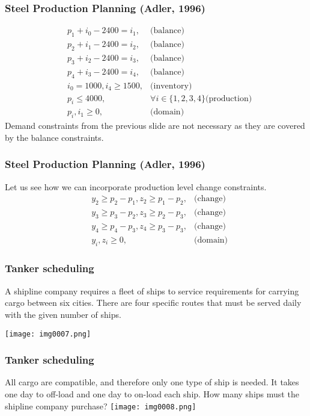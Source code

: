 \documentclass[11pt]{beamer}
\begin{document}
\begin{frame}
\frametitle{Steel Production Planning (Adler, 1996)}

\begin{align}
&p_1 + i_0 -2400 = i_1, & \mbox{(balance)}  \label{steel:balance}\\
&p_2 + i_1 -2400 = i_2, & \mbox{(balance)}  \label{steel:balance2}\\
&p_3 + i_2 -2400 = i_3, & \mbox{(balance)}  \label{steel:balance3}\\
&p_4 + i_3 -2400 = i_4, & \mbox{(balance)}  \label{steel:balance4}\\
&i_0 = 1000, i_4 \geq 1500, & \mbox{(inventory)}  \label{steel:inventory}\\
&p_i \leq 4000, & \forall i \in \{1,2,3,4\} \mbox{(production)}  \label{steel:production}\\
&p_i,i_1 \geq 0, & \mbox{(domain)}  \label{steel:domain}
\end{align}
\pause
Demand constraints from the previous slide are not necessary as they are covered by the balance constraints.
\end{frame}

\begin{frame}
\frametitle{Steel Production Planning (Adler, 1996)}
Let us see how we can incorporate production level change constraints.
\pause
\begin{align}
&y_2 \geq p_2 - p_1, z_2 \geq p_1 - p_2, & \mbox{(change)}  \label{steel:change}\\
&y_3 \geq p_3 - p_2, z_3 \geq p_2 - p_3, & \mbox{(change)}  \label{steel:change2}\\
&y_4 \geq p_4 - p_3, z_4 \geq p_3 - p_3, & \mbox{(change)}  \label{steel:change3}\\
& y_i, z_i \geq 0, & \mbox{(domain)} \label{steel:domain2}
\end{align}
\end{frame}

\begin{frame}
\frametitle{Tanker scheduling}
A shipline company requires a fleet of ships to service requirements for carrying cargo between six cities. There are four specific routes that must be served daily with the given number of ships.

\texttt{[image: img0007.png]}

\end{frame}


\begin{frame}
\frametitle{Tanker scheduling}
All cargo are compatible, and therefore only one type of ship is needed. It takes one day to off-load and one day to on-load each ship. How many ships must the shipline company purchase?
\texttt{[image: img0008.png]}

\end{frame}
\end{document}
